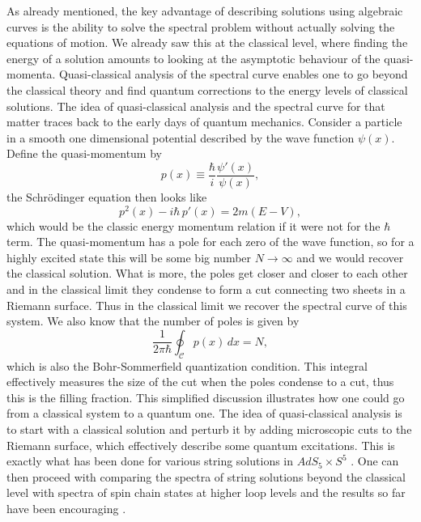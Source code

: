 As already mentioned, the key advantage of describing solutions using algebraic curves is the ability to solve the spectral problem without actually solving the equations of motion. We already saw this at the classical level, where finding the energy of a solution amounts to looking at the asymptotic behaviour of the quasi-momenta. Quasi-classical analysis of the spectral curve enables one to go beyond the classical theory and find quantum corrections to the energy levels of classical solutions. The idea of quasi-classical analysis and the spectral curve for that matter traces back to the early days of quantum mechanics. Consider a particle in a smooth one dimensional potential described by the wave function $\psi(x)$. Define the quasi-momentum by
\begin{equation}
	p(x) \equiv \frac{\hbar}{i} \frac{\psi'(x)}{\psi(x)},
\end{equation}
the Schr\"{o}dinger equation then looks like
\begin{equation}
	p^2(x) - i \hbar \, p'(x) = 2m (E - V),
\end{equation}
which would be the classic energy momentum relation if it were not for the $\hbar$ term. The quasi-momentum has a pole for each zero of the wave function, so for a highly excited state this will be some big number $N \rightarrow \infty$ and we would recover the classical solution. What is more, the poles get closer and closer to each other and in the classical limit they condense to form a cut connecting two sheets in a Riemann surface. Thus in the classical limit we recover the spectral curve of this system. We also know that the number of poles is given by
\begin{equation}
	\frac{1}{2 \pi \hbar} \oint_\mathcal{C} p(x) \, dx = N,
\end{equation}
which is also the Bohr-Sommerfield quantization condition. This integral effectively measures the size of the cut when the poles condense to a cut, thus this is the filling fraction. This simplified discussion illustrates how one could go from a classical system to a quantum one. The idea of quasi-classical analysis is to start with a classical solution and perturb it by adding microscopic cuts to the Riemann surface, which effectively describe some quantum excitations. This is exactly what has been done for various string solutions in $AdS_5 \times S^5$ \cite{gromov_quasiclassical}. One can then proceed with comparing the spectra of string solutions beyond the classical level with spectra of spin chain states at higher loop levels and the results so far have been encouraging \cite{gromov_psu}.



